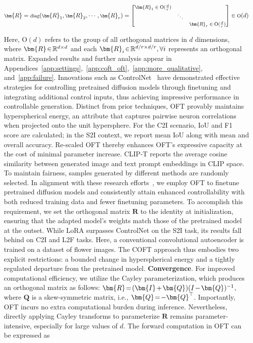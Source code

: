 {\begin{itemize}[leftmargin=*,nosep]
\begin{equation}
    \footnotesize
    \bm{R} = \text{diag}(\bm{R}_1, \bm{R}_2, \cdots, \bm{R}_r) = \begin{bmatrix}
    \bm{R}_1 \in \text{O}(\frac{d}{r}) & & \\
    & \ddots & \\
    & & \bm{R}_r \in \text{O}(\frac{d}{r})
    \end{bmatrix} \in \text{O}(d)
\end{equation}

Here, $\text{O}(d)$ refers to the group of all orthogonal matrices in $d$ dimensions, where $\thickmuskip=2mu \medmuskip=2mu \bm{R}\in\mathbb{R}^{d\times d}$ and each $\thickmuskip=2mu \medmuskip=2mu \bm{R}_i\in\mathbb{R}^{d/r\times d/r},\forall i$ represents an orthogonal matrix. Expanded results and further analysis appear in Appendices~\ref{app:settings},~\ref{app:coft_oft},~\ref{app:more_qualitative}, and~\ref{app:failure}. Innovations such as ControlNet~\cite{zhang2023adding} have demonstrated effective strategies for controlling pretrained diffusion models through finetuning and integrating additional control inputs, thus achieving impressive performance in controllable generation. Distinct from prior techniques, OFT provably maintains hyperspherical energy, an attribute that captures pairwise neuron correlations when projected onto the unit hypersphere. For the C2I scenario, IoU and F1 score are calculated; in the S2I context, we report mean IoU along with mean and overall accuracy. Re-scaled OFT thereby enhances OFT's expressive capacity at the cost of minimal parameter increase. CLIP-T reports the average cosine similarity between generated image and text prompt embeddings in CLIP space. To maintain fairness, samples generated by different methods are randomly selected. In alignment with these research efforts~\cite{zhang2023adding,mou2023t2i}, we employ OFT to finetune pretrained diffusion models and consistently attain enhanced controllability with both reduced training data and fewer finetuning parameters. To accomplish this requirement, we set the orthogonal matrix $\bm{R}$ to the identity at initialization, ensuring that the adapted model's weights match those of the pretrained model at the outset. While LoRA surpasses ControlNet on the S2I task, its results fall behind on C2I and L2F tasks. Here, a conventional convolutional autoencoder is trained on a dataset of flower images. The COFT approach thus embodies two explicit restrictions: a bounded change in hyperspherical energy and a tightly regulated departure from the pretrained model. \textbf{Convergence}. For improved computational efficiency, we utilize the Cayley parameterization, which produces an orthogonal matrix as follows: $\thickmuskip=2mu \medmuskip=2mu \bm{R} = (\bm{I} + \bm{Q})(I - \bm{Q})^{-1}$, where $\bm{Q}$ is a skew-symmetric matrix, i.e., $\thickmuskip=2mu \medmuskip=2mu \bm{Q} = -\bm{Q}^\top$. Importantly, OFT incurs no extra computational burden during inference. Nevertheless, directly applying Cayley transforms to parameterize $\bm{R}$ remains parameter-intensive, especially for large values of $d$. The forward computation in OFT can be expressed as 
\end{itemize}}
